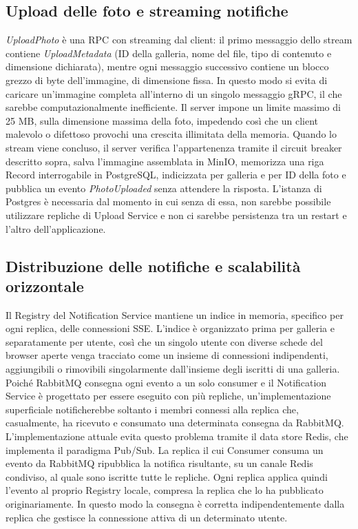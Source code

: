 \documentclass[conference]{IEEEtran}
\begin{document}
\subsection{Upload delle foto e streaming notifiche}
\textit{UploadPhoto} è una RPC con streaming dal client: il primo messaggio dello stream contiene \textit{UploadMetadata} (ID della galleria, nome del file, tipo di contenuto e dimensione dichiarata), mentre ogni messaggio successivo contiene un blocco grezzo di byte dell'immagine, di dimensione fissa. In questo modo si evita di caricare un'immagine completa all'interno di un singolo messaggio gRPC, il che sarebbe computazionalmente inefficiente. Il server impone un limite massimo di 25 MB, sulla dimensione massima della foto, impedendo così che un client malevolo o difettoso provochi una crescita illimitata della memoria. Quando lo stream viene concluso, il server verifica l'appartenenza tramite il circuit breaker descritto sopra, salva l'immagine assemblata in MinIO, memorizza una riga Record interrogabile in PostgreSQL, indicizzata per galleria e per ID della foto e pubblica un evento \textit{PhotoUploaded} senza attendere la risposta. L'istanza di Postgres è necessaria dal momento in cui senza di essa, non sarebbe possibile utilizzare repliche di Upload Service e non ci sarebbe persistenza tra un restart e l'altro dell'applicazione.
\subsection{Distribuzione delle notifiche e scalabilità orizzontale}
Il Registry del Notification Service mantiene un indice in memoria, specifico per ogni replica, delle connessioni SSE. L'indice è organizzato prima per galleria e separatamente per utente, così che un singolo utente con diverse schede del browser aperte venga tracciato come un insieme di connessioni indipendenti, aggiungibili o rimovibili singolarmente dall'insieme degli iscritti di una galleria. Poiché RabbitMQ consegna ogni evento a un solo consumer e il Notification Service è progettato per essere eseguito con più repliche, un'implementazione superficiale notificherebbe soltanto i membri connessi alla replica che, casualmente, ha ricevuto e consumato una determinata consegna da RabbitMQ. L'implementazione attuale evita questo problema tramite il data store Redis, che implementa il paradigma Pub/Sub. La replica il cui Consumer consuma un evento da RabbitMQ ripubblica la notifica risultante, su un canale Redis condiviso, al quale sono iscritte tutte le repliche. Ogni replica applica quindi l'evento al proprio Registry locale, compresa la replica che lo ha pubblicato originariamente. In questo modo la consegna è corretta indipendentemente dalla replica che gestisce la connessione attiva di un determinato utente.
\end{document}
